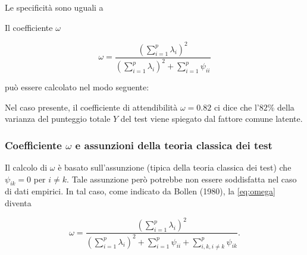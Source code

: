 \documentclass[
  11pt,
]{krantz}
\makeatletter
\newenvironment{Shaded}{\begin{snugshade}}{\end{snugshade}}
\newcommand{\CommentTok}[1]{\textcolor[rgb]{0.37,0.37,0.37}{\textit{#1}}}
\newcommand{\DecValTok}[1]{\textcolor[rgb]{0.06,0.06,0.06}{#1}}
\newcommand{\FunctionTok}[1]{\textcolor[rgb]{0,0,0}{#1}}
\newcommand{\NormalTok}[1]{#1}
\newcommand{\SpecialCharTok}[1]{\textcolor[rgb]{0,0,0}{#1}}
\newenvironment{kframe}{%
\medskip{}
\setlength{\fboxsep}{.8em}
 \def\at@end@of@kframe{}%
 \ifinner\ifhmode%
  \def\at@end@of@kframe{\end{minipage}}%
  \begin{minipage}{\columnwidth}%
 \fi\fi%
 \def\FrameCommand##1{\hskip\@totalleftmargin \hskip-\fboxsep
 \colorbox{shadecolor}{##1}\hskip-\fboxsep
     \hskip-\linewidth \hskip-\@totalleftmargin \hskip\columnwidth}%
 \MakeFramed {\advance\hsize-\width
   \@totalleftmargin\z@ \linewidth\hsize
   \@setminipage}}%
 {\par\unskip\endMakeFramed%
 \at@end@of@kframe}
\renewenvironment{Shaded}{\begin{kframe}}{\end{kframe}}
\theoremstyle{definition}
\theoremstyle{definition}
\theoremstyle{definition}
\theoremstyle{definition}
\theoremstyle{remark}
\makeatother
\begin{document}
Le specificità sono uguali a

\begin{Shaded}
\end{Shaded}

Il coefficiente \(\omega\)

\[
\omega = \frac{\left( \sum_{i=1}^p \lambda_i \right)^2}{\left( \sum_{i=1}^p \lambda_i \right)^2  + \sum_{i=1}^p \psi_{ii}}
\]

può essere calcolato nel modo seguente:

\begin{Shaded}
\end{Shaded}

Nel caso presente, il coefficiente di attendibilità \(\omega=0.82\) ci dice che l'\(82\)\% della varianza del punteggio totale \(Y\) del test viene spiegato dal fattore comune latente.

\hypertarget{coefficiente-omega-e-assunzioni-della-teoria-classica-dei-test}{%
\subsubsection{\texorpdfstring{Coefficiente \(\omega\) e assunzioni della teoria classica dei test}{Coefficiente \textbackslash omega e assunzioni della teoria classica dei test}}\label{coefficiente-omega-e-assunzioni-della-teoria-classica-dei-test}}

Il calcolo di \(\omega\) è basato sull'assunzione (tipica della teoria classica dei test) che \(\psi_{ik}=0\) per \(i\neq k\). Tale assunzione però potrebbe non essere soddisfatta nel caso di dati empirici. In tal caso, come indicato da Bollen (1980), la \eqref{eq:omega} diventa

\begin{equation}
 \omega = \frac{\left( \sum_{i=1}^p \lambda_i \right)^2}{\left( \sum_{i=1}^p \lambda_i \right)^2  + \sum_{i=1}^p \psi_{ii} + \sum_{i, k, i\neq k}^p \psi_{ik}}.
 \label{eq:omega2}
 \end{equation}
\end{document}
